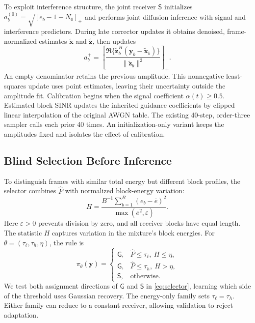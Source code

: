 \documentclass[conference]{IEEEtran}
\newcommand{\pos}[1]{[#1]_+}
\newcommand{\norm}[1]{\lVert#1\rVert}
\newcommand{\G}{\mathsf{G}}
\newcommand{\SIC}{\mathsf{S}}
\begin{document}
To exploit interference structure, the joint receiver $\SIC$ initializes
$a_b^{(0)}=\sqrt{\pos{e_b-1-N_0}}$ and performs joint diffusion inference with
signal and interference predictors. During late corrector updates it obtains
denoised, frame-normalized estimates $\widetilde{\bm x}$ and
$\widetilde{\bm z}$, then updates
\begin{equation}
 a_b^{+}=\pos{\frac{
 \Re\{\widetilde{\bm z}_b^{H}
       (\bm y_b-\widetilde{\bm x}_b)\}}
 {\norm{\widetilde{\bm z}_b}^{2}}}.
 \label{eq:amplitude}
\end{equation}
An empty denominator retains the previous amplitude. This nonnegative
least-squares update uses point estimates, leaving their uncertainty outside
the amplitude fit. Calibration begins when the signal coefficient
$\alpha(t)\ge0.5$. Estimated block SINR updates the inherited guidance
coefficients by clipped linear interpolation of the original AWGN table.
The existing 40-step, order-three sampler calls each prior 40 times. An
initialization-only variant keeps the amplitudes fixed and isolates the effect
of calibration.

\subsection{Blind Selection Before Inference}
To distinguish frames with similar total energy but different block profiles,
the selector combines $\widehat P$ with normalized block-energy variation:
\begin{equation}
 H=\frac{B^{-1}\sum_{b=1}^{B}(e_b-\bar e)^2}
          {\max(\bar e^2,\varepsilon)}.
 \label{eq:heterogeneity}
\end{equation}
Here $\varepsilon>0$ prevents division by zero, and all receiver blocks have
equal length. The statistic $H$ captures variation in the mixture's block
energies. For $\theta=(\tau_\ell,\tau_h,\eta)$, the rule is
\begin{equation}
 \pi_\theta(\bm y)=
 \begin{cases}
 \G,&\widehat P\le \tau_\ell,\ H\le\eta,\\
 \G,&\widehat P\le \tau_h,\ H>\eta,\\
 \SIC,&\text{otherwise}.
 \end{cases}
 \label{eq:selector}
\end{equation}
We test both assignment directions of $\G$ and $\SIC$ in
\eqref{eq:selector}, learning which side of the threshold uses Gaussian
recovery. The energy-only family sets $\tau_\ell=\tau_h$. Either family
can reduce to a constant receiver, allowing validation to reject adaptation.
\end{document}
